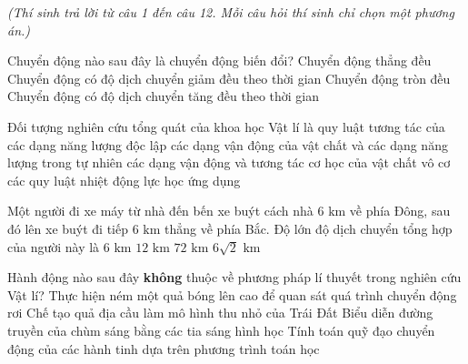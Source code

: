 
\vspace{0.15cm}
\begin{flushleft}
	{\color{blue!50!green}}
	\textit{\small (Thí sinh trả lời từ câu 1 đến câu 12. Mỗi câu hỏi thí sinh chỉ chọn một phương án.)}
\end{flushleft}
\setcounter{ex}{0}
\setcounter{bt}{0}

\begin{ex}
	Chuyển động nào sau đây là chuyển động biến đổi?
	\choice
	{Chuyển động thẳng đều}
	{Chuyển động có độ dịch chuyển giảm đều theo thời gian}
	{\True Chuyển động tròn đều}
	{Chuyển động có độ dịch chuyển tăng đều theo thời gian}
\end{ex}

\begin{ex}
	Đối tượng nghiên cứu tổng quát của khoa học Vật lí là
	\choice
	{quy luật tương tác của các dạng năng lượng độc lập}
	{\True các dạng vận động của vật chất và các dạng năng lượng trong tự nhiên}
	{các dạng vận động và tương tác cơ học của vật chất vô cơ}
	{các quy luật nhiệt động lực học ứng dụng}
\end{ex}

\begin{ex}
	Một người đi xe máy từ nhà đến bến xe buýt cách nhà $6\text{ km}$ về phía Đông, sau đó lên xe buýt đi tiếp $6\text{ km}$ thẳng về phía Bắc. Độ lớn độ dịch chuyển tổng hợp của người này là
	\choice
	{$6\text{ km}$}
	{$12\text{ km}$}
	{$72\text{ km}$}
	{\True $6\sqrt{2}\text{ km}$}
\end{ex}

\begin{ex}
	Hành động nào sau đây \textbf{không} thuộc về phương pháp lí thuyết trong nghiên cứu Vật lí?
	\choice
	{\True Thực hiện ném một quả bóng lên cao để quan sát quá trình chuyển động rơi}
	{Chế tạo quả địa cầu làm mô hình thu nhỏ của Trái Đất}
	{Biểu diễn đường truyền của chùm sáng bằng các tia sáng hình học}
	{Tính toán quỹ đạo chuyển động của các hành tinh dựa trên phương trình toán học}
\end{ex}


